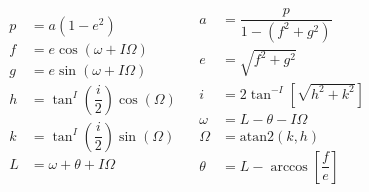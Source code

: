 %
%


\begin{align} \label{eq:keplttomee_and_meetokepl}
\begin{split}
p&=a\left(1-e^{2}\right)\\
f&=e\cos\left(\omega+I\Omega\right)\\
g&=e\sin\left(\omega+I\Omega\right)\\
h&=\tan^{I}\left(\dfrac{i}{2}\right)\cos\left(\Omega\right)\\
k&=\tan^{I}\left(\dfrac{i}{2}\right)\sin\left(\Omega\right)\\
L&=\omega+\theta+I\Omega\\
\end{split}
&
\begin{split}
a&=\dfrac{p}{1-\left(f^{2}+g^{2}\right)}\\
e&=\sqrt{f^{2}+g^{2}}\\
i&=2\tan^{-I}\left[\sqrt{h^{2}+k^{2}}\right]\\
\omega&=L-\theta-I\Omega\\
\Omega&=\text{atan}2\left(k,h\right)\\
\theta&=L-\arccos\left[\dfrac{f}{e}\right]
\end{split}
\end{align}




